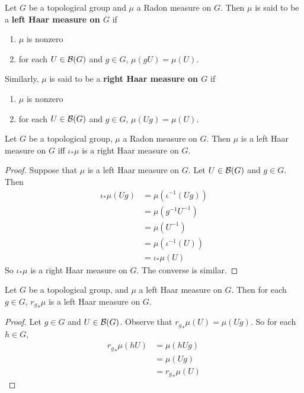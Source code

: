 \documentclass{book}
\begin{document}
	\begin{defn}  
		Let $G$ be a topological group and $\mu$ a Radon measure on $G$. Then $\mu$ is said to be a \textbf{left Haar measure on $G$} if 
		\begin{enumerate}
			\item $\mu$ is nonzero  
			\item for each $U \in \mathcal{B}(G)$ and $g \in G$, $\mu(gU) = \mu(U)$.  
		\end{enumerate}
		Similarly, $\mu$ is said to be a \textbf{right Haar measure on $G$} if 
		\begin{enumerate}
			\item $\mu$ is nonzero  
			\item for each $U \in \mathcal{B}(G)$ and $g \in G$, $\mu(Ug) = \mu(U)$.  
		\end{enumerate}
	\end{defn}
	
	\begin{ex}  
		Let $G$ be a topological group, $\mu$ a Radon measure on $G$. Then $\mu$ is a left Haar measure on $G$ iff $\iota_*\mu$ is a right Haar measure on $G$. 
	\end{ex}
	
	\begin{proof}
		Suppose that $\mu$ is a left Haar measure on $G$. Let $U \in \mathcal{B}(G)$ and $g \in G$. Then 
		\begin{align*}
			\iota_*\mu(Ug)
			& = \mu(\iota^{-1}(Ug)) \\
			&= \mu (g^{-1}U^{-1}) \\
			&= \mu (U^{-1}) \\
			&= \mu(\iota^{-1}(U)) \\
			&= \iota_*\mu(U)
		\end{align*}
		So $\iota_*\mu$ is a right Haar measure on $G$. The converse is similar.
	\end{proof}

	\begin{ex}  
		Let $G$ be a topological group, and $\mu$ a left Haar measure on $G$. Then for each $g \in G$, ${r_{g}}_*\mu$ is a left Haar measure on $G$.
	\end{ex}

	\begin{proof}
		Let $g \in G$ and $U \in \mathcal{B}(G)$. Observe that ${r_{g}}_*\mu(U) = \mu(Ug)$. So for each $h \in G$, 
		\begin{align*}
			{r_{g}}_*\mu(hU) 
			& = \mu(hUg) \\
			& =  \mu(Ug) \\
			& = {r_{g}}_*\mu(U)
		\end{align*}
	\end{proof}
	
\end{document}
